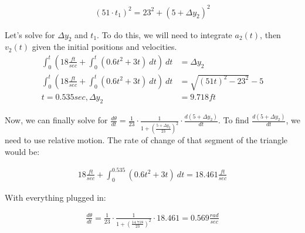 \documentclass[xcolor={usenames, dvipsnames}]{beamer}
\begin{document}
\begin{frame}

    \begin{figure}[t]
    \end{figure}

\vspace{-1cm}

    \begin{align*}
        (51 \cdot t_1)^2 = 23^2 + (5+\Delta y_2)^2
    \end{align*}

    Let's solve for $\Delta y_2$ and $t_1$. To do this, we will need to integrate $a_2(t)$, 
    then $v_2(t)$ given the initial positions and velocities. 
    \begin{align*}
       \int_{0}^{t} (18\frac{ft}{sec}+\int_{0}^{t} (0.6t^2+3t) \ dt) \ dt &= \Delta y_2 \\
       \int_{0}^{t} (18\frac{ft}{sec}+\int_{0}^{t} (0.6t^2+3t) \ dt) \ dt &= \sqrt{(51t)^2 - 23^2} - 5 \\
       t = 0.535 sec, \Delta y_2 &= 9.718 ft
    \end{align*}

\end{frame}

\begin{frame}

    Now, we can finally solve for $\frac{d\theta}{dt} = \frac{1}{23} \cdot \frac{1}{1 + (\frac{5 + \Delta y_{2}}{23})^2} \cdot \frac{d(5 + \Delta y_{2})}{dt}$. 
    To find $\frac{d(5+\Delta y_2)}{dt}$, we need to use relative motion. The rate of change of that segment of the triangle would be:

    \begin{align*}
        18\frac{ft}{sec}+\int_{0}^{0.535}(0.6t^2+3t) \ dt = 18.461 \frac{ft}{sec}
    \end{align*}

    With everything plugged in:

    \begin{align*}
        \frac{d\theta}{dt} = \frac{1}{23} \cdot \frac{1}{1 + (\frac{14.718}{23})^2} \cdot 18.461 = 0.569 \frac{rad}{sec}
    \end{align*}

\end{frame}
\end{document}
